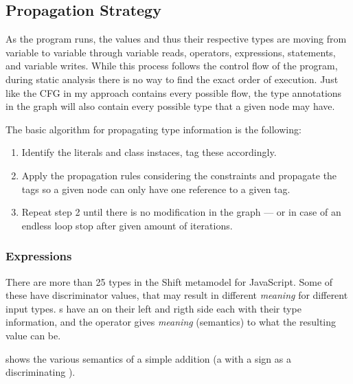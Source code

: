 \subsection{Propagation Strategy}
As the program runs, the values and thus their respective types are moving from variable to variable through variable reads, operators, expressions, statements, and variable writes. While this process follows the control flow of the program, during static analysis there is no way to find the exact order of execution. Just like the CFG in my approach contains every possible flow, the type annotations in the graph will also contain every possible type that a given node may have.

The basic algorithm for propagating type information is the following:
\begin{enumerate}[topsep=0pt]
	\item Identify the literals and class instaces, tag these accordingly.
	\item Apply the propagation rules considering the constraints and propagate the tags so a given node can only have one reference to a given tag.
	\item Repeat step 2 until there is no modification in the graph --- or in case of an endless loop stop after given amount of iterations.
\end{enumerate}

\subsubsection{Expressions}
There are more than 25 types in the Shift metamodel for JavaScript. Some of these have discriminator values, that may result in different \emph{meaning} for different input types. s have an  on their left and rigth side each with their type information, and the operator gives \emph{meaning} (semantics) to what the resulting value can be.

 shows the various semantics of a simple addition (a  with a \code{+} sign as a discriminating ).~\cite{js-arithmetic-operators}

